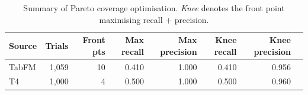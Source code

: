 \begin{table}[h]
\centering
\begin{tabular}{lrrrrrrr}
\toprule
Source & Trials & Front pts & Max recall & Max precision & Knee recall & Knee precision \\
\midrule
TabFM & 1,059 & 10 & 0.410 & 1.000 & 0.410 & 0.956 \\
T4 & 1,000 & 4 & 0.500 & 1.000 & 0.500 & 0.960 \\
\bottomrule
\end{tabular}
\caption{Summary of Pareto coverage optimisation. \emph{Knee} denotes the front point maximising recall $+$ precision.}
\label{tab:pareto-summary}
\end{table}
